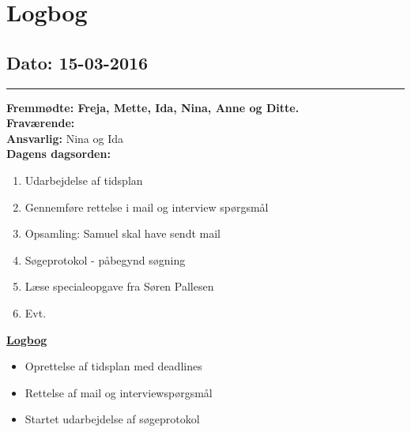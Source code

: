 \chapter{Logbog}
\section{Dato: 15-03-2016}
\hrule
\textbf{Fremmødte: Freja, Mette, Ida, Nina, Anne og Ditte.} \\
\textbf{Fraværende: } \\
\textbf{Ansvarlig:} Nina og Ida \\
\textbf{Dagens dagsorden: }
\begin{enumerate}
	\item Udarbejdelse af tidsplan
	\item Gennemføre rettelse i mail og interview spørgsmål
	\item Opsamling: Samuel skal have sendt mail
	\item Søgeprotokol - påbegynd søgning
	\item Læse specialeopgave fra Søren Pallesen
	\item Evt. 
\end{enumerate}

\underline{\textbf{Logbog}}
\begin{itemize}
\item Oprettelse af tidsplan med deadlines
\item Rettelse af mail og interviewspørgsmål
\item Startet udarbejdelse af søgeprotokol
\end{itemize}